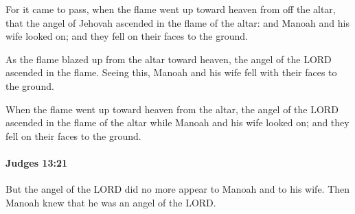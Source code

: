 			\begin{versebox}
					\item[BHS] 
					\item[ASV] For it came to pass, when the flame went up toward heaven from off the altar, that the angel of Jehovah ascended in the flame of the altar: and Manoah and his wife looked on; and they fell on their faces to the ground.
					\item[NIV] As the flame blazed up from the altar toward heaven, the angel of the LORD ascended in the flame. Seeing this, Manoah and his wife fell with their faces to the ground.
					\item[NRSV] When the flame went up toward heaven from the altar, the angel of the LORD ascended in the flame of the altar while Manoah and his wife looked on; and they fell on their faces to the ground.
			\end{versebox}

		\paragraph{Judges 13:21} %
			\label{JUDGES-13-21}

			But the angel of the LORD did no more appear to Manoah and to his wife. Then Manoah knew that he was an angel of the LORD.

